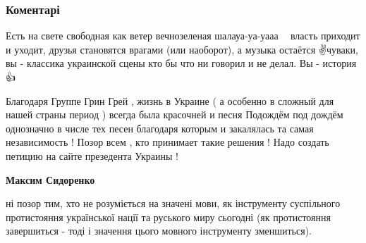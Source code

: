  
 
 
 
 
\subsubsection{Коментарі}

\begin{itemize}

 

Есть на свете свободная как ветер вечнозеленая шалауа-уа-уааа 🎸💪 власть
приходит и уходит, друзья становятся врагами (или наоборот), а музыка остаётся
✌️чуваки, вы - классика украинской сцены кто бы что ни говорил и не делал. Вы -
история 👍

 

Благодаря Группе Грин Грей , жизнь в Украине ( а особенно в сложный для нашей
страны период ) всегда была красочней и песня Подождём под дождём однозначно в
числе тех песен благодаря которым и закалялась та самая независимость ! Позор
всем , кто принимает такие решения ! Надо создать петицию на сайте презедента
Украины !

\begin{itemize}
 
\textbf{Максим Сидоренко} 

ні позор тим, хто не розуміється на значені мови, як інструменту суспільного
протистояння української нації та руського миру сьогодні (як протистояння
завершиться - тоді і значення цього мовного інструменту зменшиться).


\end{itemize}
\end{itemize}
